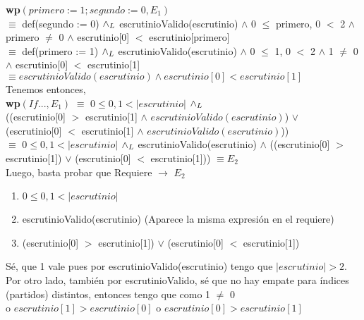 \documentclass[10pt,a4paper]{article}
\begin{document}
 \noindent \textbf{wp$(primero := 1; segundo := 0, E_1)$} \vspace{0.1cm} \\

\noindent $\equiv$ def(segundo := 0) $\land _L$ escrutinioValido(escrutinio) $\land$ 0 $\leq$ primero, 0 $<$ 2 $\land$ primero $\neq$ 0 $\land$ escrutinio[0] $<$ escrutinio[primero] \\
\noindent $\equiv$ def(primero := 1) $\land _L$ escrutinioValido(escrutinio) $\land$ 0 $\leq$ 1, 0 $<$ 2 $\land$ 1 $\neq$ 0 $\land$ escrutinio[0] $<$ escrutinio[1]  \\
\noindent $\equiv escrutinioValido(escrutinio) \land escrutinio[0] < escrutinio[1] $ \\

\noindent Tenemos entonces, \\

\noindent \textbf{wp$(If... , E_1)$}
\noindent $\equiv$ $0 \leq 0, 1 < |escrutinio|$ $\land _L$ \\  ((escrutinio[0] $>$ escrutinio[1]  $\land$ $escrutinioValido(escrutinio)$) $\lor$ \\
(escrutinio[0] $<$ escrutinio[1] $\land$ $escrutinioValido(escrutinio)$)) \\

\noindent $\equiv$ $0 \leq 0, 1 < |escrutinio|$ $\land _L$ escrutinioValido(escrutinio) $\land$ ((escrutinio[0] $>$ escrutinio[1]) $\lor$
(escrutinio[0] $<$ escrutinio[1])) $\equiv E_2$ \vspace{0.1cm} \\

\noindent Luego, basta probar que Requiere $\rightarrow$ $E_2$

\begin{enumerate}\setlength{\itemindent}{0.5cm}
		\item  $0 \leq 0, 1 < |escrutinio|$
		\item  escrutinioValido(escrutinio) (Aparece la misma expresión en el requiere)
		\item (escrutinio[0] $>$ escrutinio[1]) $\lor$ (escrutinio[0] $<$ escrutinio[1])
\end{enumerate}

\noindent Sé, que 1 vale pues por escrutinioValido(escrutinio) tengo que $|escrutinio| > 2$. Por otro lado, también por escrutinioValido, sé que no hay empate para índices (partidos) distintos, entonces tengo que como 1 $\neq$ 0 \\ o $escrutinio[1] > escrutinio[0]$ o $escrutinio[0] > escrutinio[1]$ \\
\end{document}
